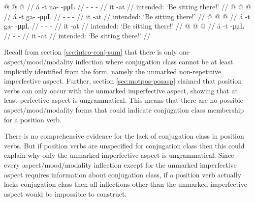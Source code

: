 \documentclass[12pt,letterpaper,oneside,article]{memoir}
\begin{document}
\pex\label{ex:motpos-posconj-imp}%
\a\label{ex:motpos-posconj-imp-n}%
\ljudge{*}%
%
\begingl
	\gla	{} @ {}  @ {} @ {} //
	\glb	á -t na-  -μμL //
	\glc	{} - -  - //
	\gld	it -at  {} {} //
	\glft	intended: ‘Be sitting there!’
		//
\endgl
\a\label{ex:motpos-posconj-imp-gh}%
\ljudge{*}%
%
\begingl
	\gla	{} @ {}  @ {} @ {} //
	\glb	á -t g̱a-  -μμL //
	\glc	{} - -  - //
	\gld	it -at  {} {} //
	\glft	intended: ‘Be sitting there!’
		//
\endgl
\a\label{ex:motpos-posconj-imp-g}%
\ljudge{*}%
%
\begingl
	\gla	{} @ {}  @ {} @ {} //
	\glb	á -t ga-  -μμL //
	\glc	{} - -  - //
	\gld	it -at  {} {} //
	\glft	intended: ‘Be sitting there!’
		//
\endgl
\a\label{ex:motpos-posconj-imp-z}%
\ljudge{*}%
%
\begingl
	\gla	{} @ {}  @ {} @ {} //
	\glb	á -t {}  -μμL //
	\glc	{} - \·  - //
	\gld	it -at  {} {} //
	\glft	intended: ‘Be sitting there!’
		//
\endgl
\xe

Recall from section \ref{sec:intro-conj-sum} that there is only one aspect/mood/modality inflection where conjugation class cannot be at least implicitly identified from the form, namely the unmarked non-repetitive imperfective aspect.
Further, section \ref{sec:motpos-posasp} claimed that position verbs can only occur with the unmarked imperfective aspect, showing that at least perfective aspect is ungrammatical.
This means that there are no possible aspect/mood/modality forms that could indicate conjugation class membership for a position verb.

There is no comprehensive evidence for the lack of conjugation class in position verbs.
But if position verbs are unspecified for conjugation class then this could explain why only the unmarked imperfective aspect is ungrammatical.
Since every aspect/mood/modality inflection except for the unmarked imperfective aspect requires information about conjugation class, if a position verb actually lacks conjugation class then all inflections other than the unmarked imperfective aspect would be impossible to construct.
\end{document}
